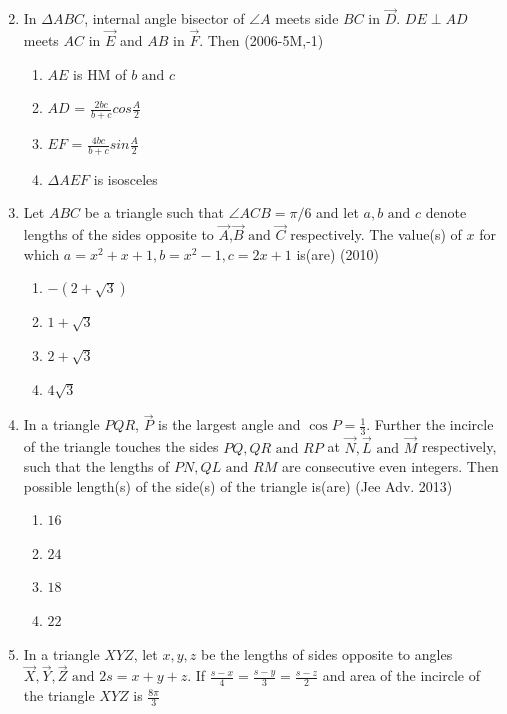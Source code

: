 \begin{enumerate}[label=\thesubsection.\arabic*,ref=\thesubsection.\theenumi]
\begin{multicols}{2}
\begin{enumerate}
    	\end{enumerate}
    \end{multicols}
    \item In $\Delta ABC$, internal angle bisector of $\angle A$ meets side $BC$ in $\vec{D}$. $DE \perp AD$ meets $AC$ in $\vec{E}$ and $AB$ in $\vec{F}$. Then
    \hfill{(2006-5M,-1)}
    \begin{enumerate}
    	\item $AE$ is HM of $b \text{ and } c$
    	\item $AD$ = ${\frac{2bc}{b+c}}cos{\frac{A}{2}}$
    	\item $EF$ = ${\frac{4bc}{b+c}}sin{\frac{A}{2}}$
    	\item $\Delta AEF$ is isosceles
    \end{enumerate}
    \item Let $ABC$ be a triangle such that $\angle ACB = \pi/6$ and let $a,b \text{ and } c$ denote lengths of the sides opposite to $\vec{A}$,$\vec{B} \text{ and } \vec{C}$ respectively. The value(s) of $x$ for which $a = x^{2}+x+1, b = x^{2}-1, c = 2x+1$ is(are)
    \hfill{(2010)}
    \begin{multicols}{2}
    	\begin{enumerate}
    		\item $-(2+\sqrt{3})$
    		\item $1+\sqrt{3}$
    		\item $2+\sqrt{3}$
    		\item $4\sqrt{3}$
    	\end{enumerate}
    \end{multicols}
    \item In a triangle $PQR$, $\vec{P}$ is the largest angle and $\cos{P} = \frac{1}{3}$. Further the incircle of the triangle touches the sides $PQ,QR \text{ and } RP$ at $\vec{N},\vec{L} \text{ and } \vec{M}$ respectively, such that the lengths of $PN, QL \text{ and } RM$ are consecutive even integers. Then possible length(s) of the side(s) of the triangle is(are)
    \hfill{(Jee Adv. 2013)}
    \begin{multicols}{2}
    	\begin{enumerate}
    		\item $16$
    		\item $24$
    		\item $18$
    		\item $22$
    	\end{enumerate}
    \end{multicols}
    \item In a triangle $XYZ$, let $x,y,z$ be the lengths of sides opposite to angles $\vec{X},\vec{Y},\vec{Z} \text{ and } 2s = x+y+z$. If ${\frac{s-x}{4}}={\frac{s-y}{3}}={\frac{s-z}{2}}$ and area of the incircle of the triangle $XYZ$ is ${\frac{8\pi}{3}}$

\end{enumerate}
